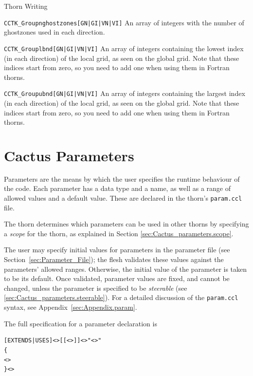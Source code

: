 \begin{cactuspart}{Thorn Writing}
\begin{Lentry}
\item [\texttt{CCTK\_Groupnghostzones[GN|GI|VN|VI]}]    An array of integers with
         the number of ghostzones used in each direction.

\item [\texttt{CCTK\_Grouplbnd[GN|GI|VN|VI]}]       An array of integers
      containing the lowest index (in each direction)
      of the local grid, as seen on the global grid. Note that these indices
      start from zero, so you need to add one when using them in
      Fortran thorns.

\item [\texttt{CCTK\_Groupubnd[GN|GI|VN|VI]}]       An array of integers
      containing the largest index (in each direction)
      of the local grid, as seen on the global grid. Note that these indices
      start from zero, so you need to add one when using them in
      Fortran thorns.

\end{Lentry}


\section{Cactus Parameters}
\label{chap:Cactus_parameters}

Parameters are the means by which the user specifies the runtime behaviour of
the code.  Each parameter has a data type and a name, as well as a
range of allowed values and a default value.  These are declared in the thorn's
\texttt{param.ccl} file.

The thorn determines which parameters can be used in other thorns by
specifying a \textit{scope} for the thorn, as explained in Section
\ref{sec:Cactus_parameters.scope}.

The user may specify initial values for parameters in the parameter file
(see Section~\ref{sec:Parameter_File}); the flesh validates these values
against the parameters' allowed ranges.
Otherwise, the initial value of the parameter is taken to be its default.
Once validated, parameter values are fixed, and cannot be changed,
unless the parameter is specified to be \textit{steerable}
(see \ref{sec:Cactus_parameters.steerable}).
For a detailed discussion of the \texttt{param.ccl} syntax, see
Appendix~\ref{sec:Appendix.param}.

The full specification for a parameter declaration is
\begin{alltt}
[EXTENDS|USES] <>[[<>]] <> "<>"
\{
  <>
\} <>
\end{alltt}


\end{cactuspart}
